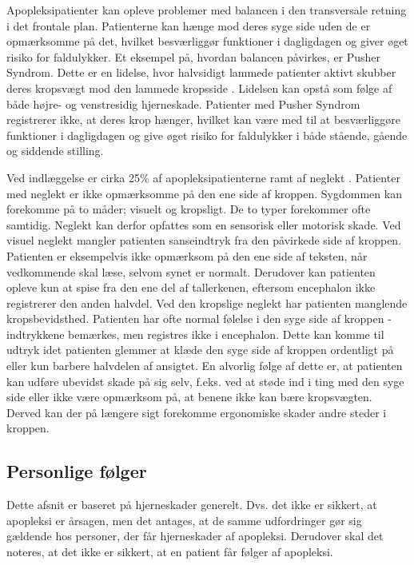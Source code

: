 Apopleksipatienter kan opleve problemer med balancen i den transversale retning i det frontale plan. Patienterne kan hænge mod deres syge side uden de er opmærksomme på det, hvilket besværliggør funktioner i dagligdagen og giver øget risiko for faldulykker. Et eksempel på, hvordan balancen påvirkes, er Pusher Syndrom. Dette er en lidelse, hvor halvsidigt lammede patienter aktivt skubber deres kropsvægt mod den lammede kropsside \cite{Karnath2003}. Lidelsen kan opstå som følge af både højre- og venstresidig hjerneskade. Patienter med Pusher Syndrom registrerer ikke, at deres krop hænger, hvilket kan være med til at besværliggøre funktioner i dagligdagen og give øget risiko for faldulykker i både stående, gående og siddende stilling. \cite{Karnath2003} 

Ved indlæggelse er cirka 25\% af apopleksipatienterne ramt af neglekt \cite{Sundhedsstyrelsen2009}. Patienter med neglekt er ikke opmærksomme på den ene side af kroppen. Sygdommen kan forekomme på to måder; visuelt og kropsligt. De to typer forekommer ofte samtidig. Neglekt kan derfor opfattes som en sensorisk eller motorisk skade. Ved visuel neglekt mangler patienten sanseindtryk fra den påvirkede side af kroppen. Patienten er eksempelvis ikke opmærksom på den ene side af teksten, når vedkommende skal læse, selvom synet er normalt. Derudover kan patienten opleve kun at spise fra den ene del af tallerkenen, eftersom encephalon ikke registrerer den anden halvdel. Ved den kropslige neglekt har patienten manglende kropsbevidsthed. Patienten har ofte normal følelse i den syge side af kroppen - indtrykkene bemærkes, men registres ikke i encephalon. Dette kan komme til udtryk idet patienten glemmer at klæde den syge side af kroppen ordentligt på eller kun barbere halvdelen af ansigtet. En alvorlig følge af dette er, at patienten kan udføre ubevidst skade på sig selv, f.eks. ved at støde ind i ting med den syge side eller ikke være opmærksom på, at benene ikke kan bære kropsvægten. Derved kan der på længere sigt forekomme ergonomiske skader andre steder i kroppen. \cite{Sundhed.dk}

\subsection{Personlige følger}
Dette afsnit er baseret på hjerneskader generelt. Dvs. det ikke er sikkert, at apopleksi er årsagen, men det antages, at de samme udfordringer gør sig gældende hos personer, der får hjerneskader af apopleksi. Derudover skal det noteres, at det ikke er sikkert, at en patient får følger af apopleksi.


